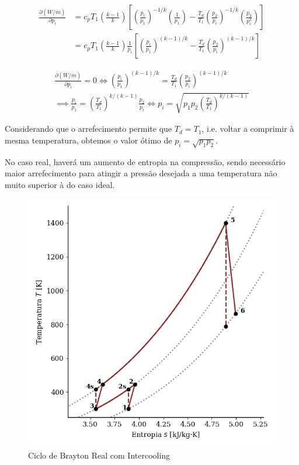 \begin{equation*}
    \begin{split}
        \frac{\partial (\dot{W}/ \dot{m})}{\partial p_i} & = c_p T_1 \left( \frac{k-1}{k} \right) \left[ \left( \frac{p_i}{p_1} \right)^{-1/k}  \left( \frac{1}{p_1} \right) - \frac{T_d}{T_1} \left( \frac{p_2}{p_i} \right)^{-1/k} \left( \frac{p_2}{p_i^2} \right) \right] \\
        & = c_p T_1 \left( \frac{k-1}{k} \right) \frac{1}{p_i} \left[ \left( \frac{p_i}{p_1} \right)^{(k-1)/k} - \frac{T_d}{T_1} \left( \frac{p_2}{p_i} \right)^{(k-1)/k} \right]
    \end{split}
\end{equation*}

\begin{eqnarray}
    \frac{\partial (\dot{W}/ \dot{m})}{\partial p_i} = 0 \Longleftrightarrow \left( \frac{p_i}{p_1} \right)^{(k-1)/k} = \frac{T_d}{T_1} \left( \frac{p_2}{p_i} \right)^{(k-1)/k} \nonumber \\ 
    \implies \frac{p_i}{p_1} = \left( \frac{T_d}{T_1}\right)^{k/(k-1)} \frac{p_2}{p_i} \Longleftrightarrow p_i = \sqrt{p_1 p_2 \left( \frac{T_d}{T_1}\right)^{k/(k-1)}}
\end{eqnarray}

Considerando que o arrefecimento permite que $T_d = T_1$, i.e. voltar a comprimir à mesma temperatura, obtemos o valor ótimo de $p_i = \sqrt{p_1 p_2}$.

No caso real, haverá um aumento de entropia na compressão, sendo necessário maior arrefecimento para atingir a pressão desejada a uma temperatura não muito superior à do caso ideal.

\begin{figure}[H]
    \centering
    \includegraphics[width=0.45\linewidth]{graphs/brayton-Ts-real-intercooling.png}
    \caption{Ciclo de Brayton Real com Intercooling}
    \label{fig:brayton-Ts-real-intercooling}
\end{figure}